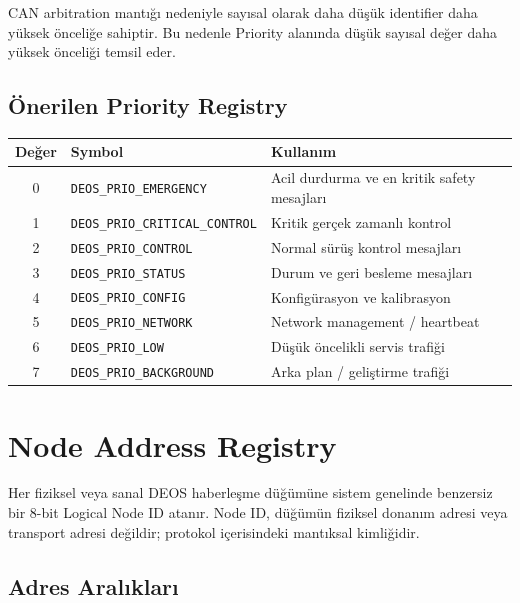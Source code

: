 \documentclass[a4paper,10pt]{article}
\newcommand{\code}[1]{\texttt{#1}}
\begin{document}
CAN arbitration mantığı nedeniyle sayısal olarak daha düşük identifier daha yüksek
önceliğe sahiptir. Bu nedenle Priority alanında düşük sayısal değer daha yüksek önceliği
temsil eder.

\subsection{Önerilen Priority Registry}

\begin{center}
\begin{tabularx}{\textwidth}{c l X}
\toprule
Değer & Symbol & Kullanım \\
\midrule
0 & \code{DEOS\_PRIO\_EMERGENCY} & Acil durdurma ve en kritik safety mesajları \\
1 & \code{DEOS\_PRIO\_CRITICAL\_CONTROL} & Kritik gerçek zamanlı kontrol \\
2 & \code{DEOS\_PRIO\_CONTROL} & Normal sürüş kontrol mesajları \\
3 & \code{DEOS\_PRIO\_STATUS} & Durum ve geri besleme mesajları \\
4 & \code{DEOS\_PRIO\_CONFIG} & Konfigürasyon ve kalibrasyon \\
5 & \code{DEOS\_PRIO\_NETWORK} & Network management / heartbeat \\
6 & \code{DEOS\_PRIO\_LOW} & Düşük öncelikli servis trafiği \\
7 & \code{DEOS\_PRIO\_BACKGROUND} & Arka plan / geliştirme trafiği \\
\bottomrule
\end{tabularx}
\end{center}


\section{Node Address Registry}

Her fiziksel veya sanal DEOS haberleşme düğümüne sistem genelinde benzersiz bir 8-bit
Logical Node ID atanır. Node ID, düğümün fiziksel donanım adresi veya transport adresi
değildir; protokol içerisindeki mantıksal kimliğidir.

\subsection{Adres Aralıkları}
\end{document}
